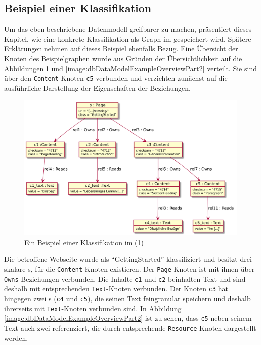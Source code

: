\subsection{Beispiel einer Klassifikation}
    \label{section:solutionDetailPersistenceDataModelExample}
    Um das eben beschriebene Datenmodell greifbarer zu machen,
    präsentiert dieses Kapitel, wie eine konkrete Klassifikation als
    Graph im {\classificationStorage} gespeichert wird.
    Spätere Erklärungen nehmen auf dieses Beispiel ebenfalls Bezug.
    Eine Übersicht der Knoten des Beispielgraphen wurde aus Gründen
    der Übersichtlichkeit auf die Abbildungen \ref{image:dbDataModelExampleOverviewPart1}
    und \ref{image:dbDataModelExampleOverviewPart2} verteilt.
    Sie sind über den \texttt{Content}-Knoten \texttt{c5} verbunden
    und verzichten zunächst auf die ausführliche Darstellung der Eigenschaften der Beziehungen.

    \begin{figure}[htb]
        \centering
        \includegraphics[scale=\imageScalingFactor]{../resources/db-data-model/example/example_part1.png}
        \caption{Ein Beispiel einer Klassifikation im {\classificationStorage} (1)}
        \label{image:dbDataModelExampleOverviewPart1}
    \end{figure}

    Die betroffene Webseite wurde als "`GettingStarted"' klassifiziert und besitzt drei skalare {\contentFeature}s,
    für die \texttt{Content}-Knoten existieren.
    Der \texttt{Page}-Knoten ist mit ihnen über \texttt{Owns}-Beziehungen verbunden.
    Die Inhalte \texttt{c1} und \texttt{c2} beinhalten Text und sind deshalb mit entsprechenden \texttt{Text}-Knoten verbunden.
    Der Knoten \texttt{c3} hat hingegen zwei {\childFeature}s (\texttt{c4} und \texttt{c5}), die seinen Text feingranular speichern
    und deshalb ihrerseits mit \texttt{Text}-Knoten verbunden sind.
    In Abbildung \ref{image:dbDataModelExampleOverviewPart2} ist zu sehen,
    dass \texttt{c5} neben seinem Text auch zwei {\resources} referenziert,
    die durch entsprechende \texttt{Resource}-Knoten dargestellt werden.

